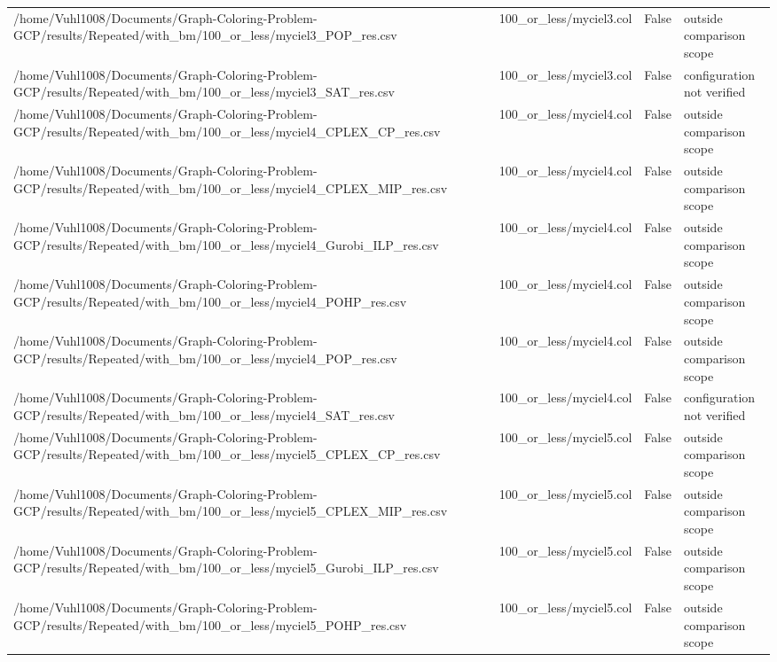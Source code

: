 \begin{table}[htbp]
\begin{tabular}{llll}
/home/Vuhl1008/Documents/Graph-Coloring-Problem-GCP/results/Repeated/with\_bm/100\_or\_less/myciel3\_POP\_res.csv & 100\_or\_less/myciel3.col & False & outside comparison scope \\
/home/Vuhl1008/Documents/Graph-Coloring-Problem-GCP/results/Repeated/with\_bm/100\_or\_less/myciel3\_SAT\_res.csv & 100\_or\_less/myciel3.col & False & configuration not verified \\
/home/Vuhl1008/Documents/Graph-Coloring-Problem-GCP/results/Repeated/with\_bm/100\_or\_less/myciel4\_CPLEX\_CP\_res.csv & 100\_or\_less/myciel4.col & False & outside comparison scope \\
/home/Vuhl1008/Documents/Graph-Coloring-Problem-GCP/results/Repeated/with\_bm/100\_or\_less/myciel4\_CPLEX\_MIP\_res.csv & 100\_or\_less/myciel4.col & False & outside comparison scope \\
/home/Vuhl1008/Documents/Graph-Coloring-Problem-GCP/results/Repeated/with\_bm/100\_or\_less/myciel4\_Gurobi\_ILP\_res.csv & 100\_or\_less/myciel4.col & False & outside comparison scope \\
/home/Vuhl1008/Documents/Graph-Coloring-Problem-GCP/results/Repeated/with\_bm/100\_or\_less/myciel4\_POHP\_res.csv & 100\_or\_less/myciel4.col & False & outside comparison scope \\
/home/Vuhl1008/Documents/Graph-Coloring-Problem-GCP/results/Repeated/with\_bm/100\_or\_less/myciel4\_POP\_res.csv & 100\_or\_less/myciel4.col & False & outside comparison scope \\
/home/Vuhl1008/Documents/Graph-Coloring-Problem-GCP/results/Repeated/with\_bm/100\_or\_less/myciel4\_SAT\_res.csv & 100\_or\_less/myciel4.col & False & configuration not verified \\
/home/Vuhl1008/Documents/Graph-Coloring-Problem-GCP/results/Repeated/with\_bm/100\_or\_less/myciel5\_CPLEX\_CP\_res.csv & 100\_or\_less/myciel5.col & False & outside comparison scope \\
/home/Vuhl1008/Documents/Graph-Coloring-Problem-GCP/results/Repeated/with\_bm/100\_or\_less/myciel5\_CPLEX\_MIP\_res.csv & 100\_or\_less/myciel5.col & False & outside comparison scope \\
/home/Vuhl1008/Documents/Graph-Coloring-Problem-GCP/results/Repeated/with\_bm/100\_or\_less/myciel5\_Gurobi\_ILP\_res.csv & 100\_or\_less/myciel5.col & False & outside comparison scope \\
/home/Vuhl1008/Documents/Graph-Coloring-Problem-GCP/results/Repeated/with\_bm/100\_or\_less/myciel5\_POHP\_res.csv & 100\_or\_less/myciel5.col & False & outside comparison scope \\

\end{tabular}
\end{table}
